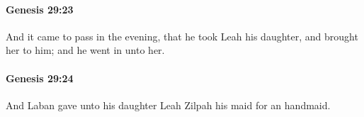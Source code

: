 		\paragraph{Genesis 29:23} %
			\label{GENESIS-29-23}

			And it came to pass in the evening, that he took Leah his daughter, and brought her to him; and he went in unto her.


		\paragraph{Genesis 29:24} %
			\label{GENESIS-29-24}

			And Laban gave unto his daughter Leah Zilpah his maid for an handmaid.


